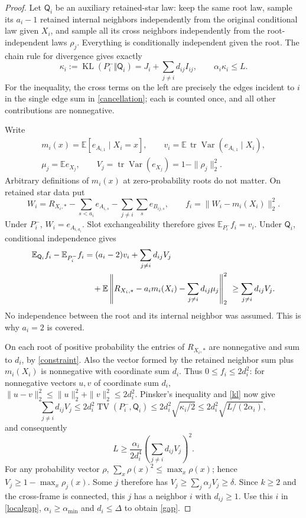 \documentclass[11pt]{article}
\newcommand{\E}{\mathbb E}
\newcommand{\KL}{\operatorname{KL}}
\newcommand{\TV}{\operatorname{TV}}
\newcommand{\Var}{\operatorname{Var}}
\begin{document}
\begin{proof}
Let $\mathsf Q_i$ be an auxiliary retained-star law: keep the same root
law, sample its $a_i-1$ retained internal neighbors independently from
the original conditional law given $X_i$, and sample all its cross
neighbors independently from the root-independent laws $\rho_j$.
Everything is conditionally independent given the root. The chain rule
for divergence gives exactly
\begin{equation}
 \kappa_i:=\KL(P_i^-\Vert\mathsf Q_i)
 =J_i+\sum_{j\ne i}d_{ij}I_{ij},\qquad
 \alpha_i\kappa_i\leq L.
 \label{kl}
\end{equation}
For the inequality, the cross terms on the left are precisely the edges
incident to $i$ in the single edge sum in \eqref{cancellation}; each is
counted once, and all other contributions are nonnegative.

Write
\[
\begin{gathered}
 m_i(x)=\E[e_{A_{i,1}}\mid X_i=x],\qquad
 v_i=\E\,\operatorname{tr}\Var(e_{A_{i,1}}\mid X_i),\\
 \mu_j=\E e_{X_j},\qquad V_j=\operatorname{tr}\Var(e_{X_j})
       =1-\|\rho_j\|_2^2.
\end{gathered}
\]
Arbitrary definitions of $m_i(x)$ at zero-probability roots do not matter.
On retained star data put
\[
 W_i=R_{X_i,*}-\sum_{s<a_i}e_{A_{i,s}}
       -\sum_{j\ne i}\sum_s e_{B_{ij,s}},\qquad
 f_i=\|W_i-m_i(X_i)\|_2^2.
\]
Under $P_i^-$, $W_i=e_{A_{i,a_i}}$. Slot exchangeability therefore gives
$\E_{P_i^-}f_i=v_i$. Under $\mathsf Q_i$, conditional independence gives
\begin{align}
 \E_{\mathsf Q_i}f_i-\E_{P_i^-}f_i
 &=(a_i-2)v_i+\sum_{j\ne i}d_{ij}V_j\notag\\
 &\quad+\E\left\|R_{X_i,*}-a_i m_i(X_i)
                -\sum_{j\ne i}d_{ij}\mu_j\right\|_2^2
 \ \geq\sum_{j\ne i}d_{ij}V_j.
 \label{variance}
\end{align}
No independence between the root and its internal neighbor was assumed.
This is why $a_i=2$ is covered.

On each root of positive probability the entries of $R_{X_i,*}$ are
nonnegative and sum to $d_i$, by \eqref{constraint}. Also the vector
formed by the retained neighbor sum plus $m_i(X_i)$ is nonnegative with
coordinate sum $d_i$. Thus $0\leq f_i\leq2d_i^2$: for nonnegative vectors
$u,v$ of coordinate sum $d_i$,
$\|u-v\|_2^2\leq\|u\|_2^2+\|v\|_2^2\leq2d_i^2$.
Pinsker's inequality and \eqref{kl} now give
\[
 \sum_{j\ne i}d_{ij}V_j
 \leq2d_i^2\TV(P_i^-,\mathsf Q_i)
 \leq2d_i^2\sqrt{\kappa_i/2}
 \leq2d_i^2\sqrt{L/(2\alpha_i)},
\]
and consequently
\begin{equation}
 L\geq\frac{\alpha_i}{2d_i^4}
       \left(\sum_{j\ne i}d_{ij}V_j\right)^2.
 \label{localgap}
\end{equation}
For any probability vector $\rho$, $\sum_x\rho(x)^2\leq\max_x\rho(x)$;
hence $V_j\geq1-\max_x\rho_j(x)$. Some $j$ therefore has
$V_j\geq\sum_j\alpha_jV_j\geq\delta$. Since $k\geq2$ and the cross-frame
is connected, this $j$ has a neighbor $i$ with $d_{ij}\geq1$.
Use this $i$ in \eqref{localgap}, $\alpha_i\geq\alpha_{\min}$ and
$d_i\leq\Delta$ to obtain \eqref{gap}.


\end{proof}
\end{document}
